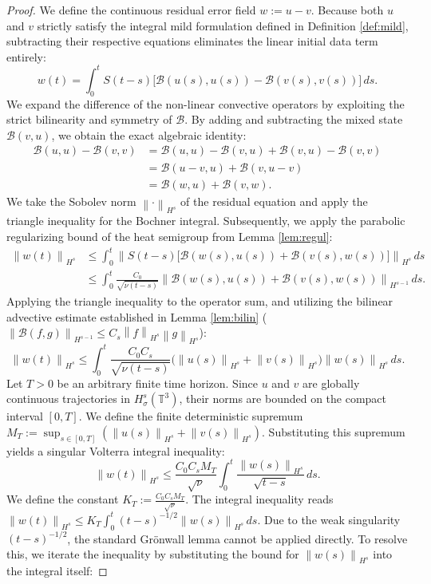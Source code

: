 \documentclass[12pt,a4paper]{article}
\theoremstyle{plain}
\theoremstyle{definition}
\theoremstyle{remark}
\newcommand{\T}{\mathbb{T}}
\newcommand{\norm}[1]{\left\|#1\right\|}
\newcommand{\BB}{\mathcal{B}}
\begin{document}
\begin{proof}
We define the continuous residual error field $w := u - v$. Because both $u$ and $v$ strictly satisfy the integral mild formulation defined in Definition \ref{def:mild}, subtracting their respective equations eliminates the linear initial data term entirely:
\[
  w(t) = \int_0^t S(t-s)\big[\BB(u(s), u(s)) - \BB(v(s), v(s))\big]\,ds.
\]
We expand the difference of the non-linear convective operators by exploiting the strict bilinearity and symmetry of $\BB$. By adding and subtracting the mixed state $\BB(v,u)$, we obtain the exact algebraic identity:
\begin{align*}
  \BB(u,u) - \BB(v,v) 
  &= \BB(u,u) - \BB(v,u) + \BB(v,u) - \BB(v,v) \\
  &= \BB(u-v, u) + \BB(v, u-v) \\
  &= \BB(w, u) + \BB(v, w).
\end{align*}
We take the Sobolev norm $\norm{\cdot}_{H^s}$ of the residual equation and apply the triangle inequality for the Bochner integral. Subsequently, we apply the parabolic regularizing bound of the heat semigroup from Lemma \ref{lem:regul}:
\begin{align*}
  \norm{w(t)}_{H^s} 
  &\le \int_0^t \norm{S(t-s) \big[ \BB(w(s), u(s)) + \BB(v(s), w(s)) \big]}_{H^s} \,ds \\
  &\le \int_0^t \frac{C_0}{\sqrt{\nu(t-s)}} \norm{\BB(w(s), u(s)) + \BB(v(s), w(s))}_{H^{s-1}} \,ds.
\end{align*}
Applying the triangle inequality to the operator sum, and utilizing the bilinear advective estimate established in Lemma \ref{lem:bilin} ($\norm{\BB(f,g)}_{H^{s-1}} \le C_s \norm{f}_{H^s} \norm{g}_{H^s}$):
\[
  \norm{w(t)}_{H^s} \le \int_0^t \frac{C_0 C_s}{\sqrt{\nu(t-s)}} \Big( \norm{u(s)}_{H^s} + \norm{v(s)}_{H^s} \Big) \norm{w(s)}_{H^s} \,ds.
\]
Let $T > 0$ be an arbitrary finite time horizon. Since $u$ and $v$ are globally continuous trajectories in $H^s_\sigma(\T^3)$, their norms are bounded on the compact interval $[0,T]$. We define the finite deterministic supremum $M_T := \sup_{s \in [0,T]} (\norm{u(s)}_{H^s} + \norm{v(s)}_{H^s})$. Substituting this supremum yields a singular Volterra integral inequality:
\[
  \norm{w(t)}_{H^s} \le \frac{C_0 C_s M_T}{\sqrt{\nu}} \int_0^t \frac{\norm{w(s)}_{H^s}}{\sqrt{t-s}} \,ds.
\]
We define the constant $K_T := \frac{C_0 C_s M_T}{\sqrt{\nu}}$. The integral inequality reads $\norm{w(t)}_{H^s} \le K_T \int_0^t (t-s)^{-1/2} \norm{w(s)}_{H^s} \,ds$. Due to the weak singularity $(t-s)^{-1/2}$, the standard Grönwall lemma cannot be applied directly. To resolve this, we iterate the inequality by substituting the bound for $\norm{w(s)}_{H^s}$ into the integral itself:

\end{proof}
\end{document}
